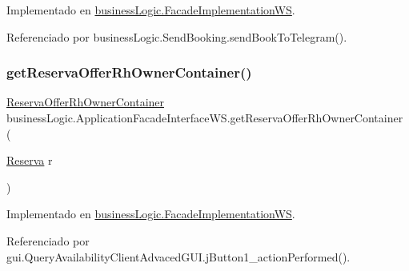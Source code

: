 Implementado en \mbox{\hyperlink{classbusiness_logic_1_1_facade_implementation_w_s_a7b8deff7fb54e2ea7fa884fc13870d6d}{business\+Logic.\+Facade\+Implementation\+WS}}.



Referenciado por business\+Logic.\+Send\+Booking.\+send\+Book\+To\+Telegram().

\mbox{\label{interfacebusiness_logic_1_1_application_facade_interface_w_s_a2f7ed5fbb8427eee05fdaa0a0dc9348b}} 
\subsubsection{\texorpdfstring{getReservaOfferRhOwnerContainer()}{getReservaOfferRhOwnerContainer()}}
{\footnotesize\ttfamily \mbox{\hyperlink{classdomain_1_1_reserva_offer_rh_owner_container}{Reserva\+Offer\+Rh\+Owner\+Container}} business\+Logic.\+Application\+Facade\+Interface\+W\+S.\+get\+Reserva\+Offer\+Rh\+Owner\+Container (\begin{DoxyParamCaption}\item[{\mbox{\hyperlink{classdomain_1_1_reserva}{Reserva}}}]{r }\end{DoxyParamCaption})}



Implementado en \mbox{\hyperlink{classbusiness_logic_1_1_facade_implementation_w_s_a2b0b70f214ee9b8e67a2e5373d0c176d}{business\+Logic.\+Facade\+Implementation\+WS}}.



Referenciado por gui.\+Query\+Availability\+Client\+Advaced\+G\+U\+I.\+j\+Button1\+\_\+action\+Performed().

\mbox{\label{interfacebusiness_logic_1_1_application_facade_interface_w_s_aeda86c46b75acfc4befb30f5d0e98e7c}} 
